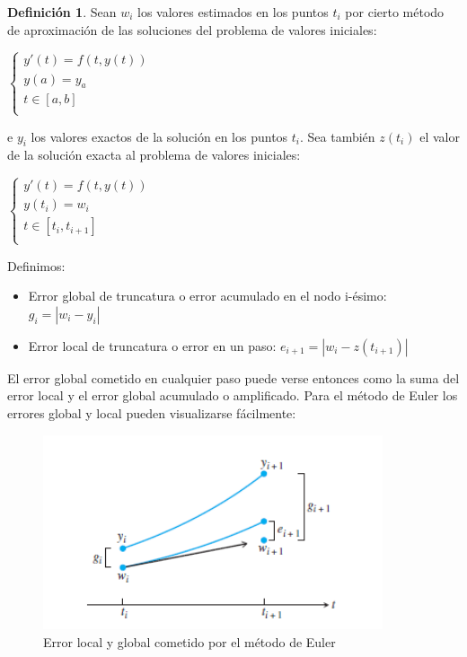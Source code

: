 \documentclass{article}
\theoremstyle{theorem-style}  %
\theoremstyle{definition}
\newtheorem{definition}{Definición}[section]
\theoremstyle{example-style}
\begin{document}
\begin{definition} Sean $w_i$ los valores estimados en los puntos $t_i$ por cierto método de aproximación de las soluciones del problema de valores iniciales:
\begin{center}
$\begin{cases}
y'(t) = f(t,y(t)) \\
y(a) = y_a \\
t \in [a,b] \\
\end{cases}$
\end{center}
e $y_i$ los valores exactos de la solución en los puntos $t_i$. Sea también $z(t_i)$ el valor de la solución exacta al problema de valores iniciales:
\begin{center}
$\begin{cases}
y'(t) = f(t,y(t)) \\
y(t_i) = w_i \\
t \in [t_i,t_{i+1}] \\
\end{cases}$
\end{center}
Definimos:
\begin{itemize}
\item Error global de truncatura o error acumulado en el nodo i-ésimo: $g_i=|w_i-y_i|$
\item Error local de truncatura o error en un paso: $e_{i+1} = |w_i-z(t_{i+1})|$
\end{itemize} 
\end{definition}

El error global cometido en cualquier paso puede verse entonces como la suma del error local y el error global acumulado o amplificado. Para el método de Euler los errores global y local pueden visualizarse fácilmente:

\begin{figure}[h]
\centering
\includegraphics[width=10cm]{./Images/error-euler.png}
\caption{Error local y global cometido por el método de Euler} 
\label{fig:error-euler}
\end{figure}
\end{document}
